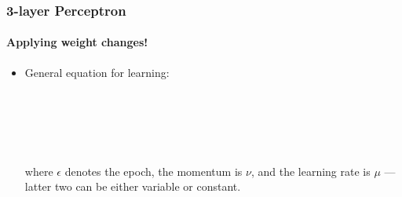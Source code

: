 \documentclass{beamer}
\newcommand{\figheight}{0.72\textheight}
\begin{document}
\begin{frame}[fragile]
\frametitle{3-layer Perceptron}
\framesubtitle{Applying weight changes!}

 

     
\begin{itemize}



 \item<1-> General equation for learning:
 
 \ \\
 
 \ \\
 \begin{center}
  


   
 \end{center}

  
 \ \\
 
 \ \\

  {where $\epsilon$ denotes the epoch, the momentum is $\nu$, and the learning rate is $\mu$ --- latter two  can be either variable or constant. }
\end{itemize}

% 
% 
% 
% 
\end{frame}
\end{document}
